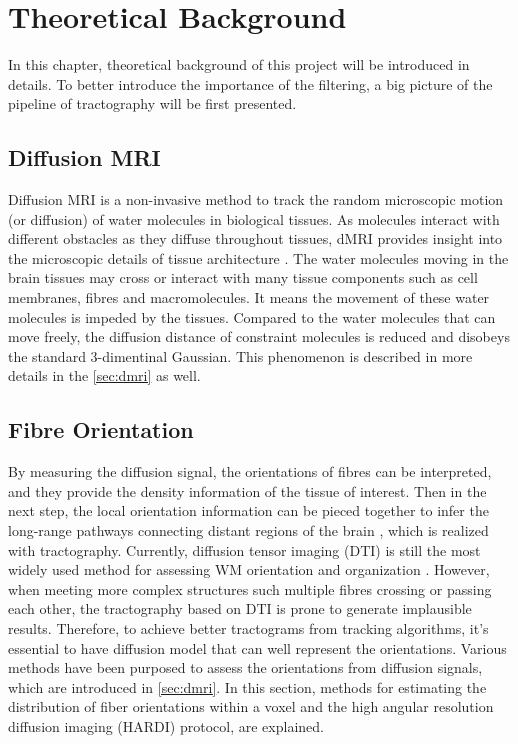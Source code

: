 \chapter{Theoretical Background}


In this chapter, theoretical background of this project will be introduced in details. To better introduce the importance of the filtering, a big picture of the pipeline of tractography will be first presented. 

\section{Diffusion MRI}

Diffusion MRI is a non-invasive method to track the random microscopic motion (or diffusion) of water molecules in biological tissues. 
As molecules interact with different obstacles as they diffuse throughout tissues, 
dMRI provides insight into the microscopic details of tissue architecture \cite{newmanChapterMorphologicalBrain2014}. 
The water molecules moving in the brain tissues may cross or interact with many tissue components such as cell membranes, fibres and macromolecules. \cite{lebihanLookingFunctionalArchitecture2003}
It means the movement of these water molecules is impeded by the tissues. 
Compared to the water molecules that can move freely, 
the diffusion distance of constraint molecules is reduced and disobeys the standard 3-dimentinal Gaussian. 
This phenomenon is described in more details in the \ref{sec:dmri} as well.

\section{Fibre Orientation}
By measuring the diffusion signal, the orientations of fibres can be interpreted, and they provide the density information of the tissue of interest.
Then in the next step, the local orientation information can be pieced together to infer the long-range pathways connecting distant regions of the brain \cite{lebihanLookingFunctionalArchitecture2003}, 
which is realized with tractography. 
Currently, diffusion tensor imaging (DTI) is still the most widely used method for assessing WM orientation and organization \cite{basserEstimationEffectiveSelfDiffusion1994}.
However, when meeting more complex structures such multiple fibres crossing or passing each other, the tractography based on DTI is prone to 
generate implausible results. Therefore, to achieve better tractograms from tracking algorithms, it's essential to have diffusion model that can 
well represent the orientations. Various methods have been purposed to assess the orientations from diffusion signals, which are introduced in \ref{sec:dmri}.
In this section, methods for estimating the distribution of fiber orientations within a voxel and the high angular resolution diffusion imaging (HARDI) protocol, are explained. 

